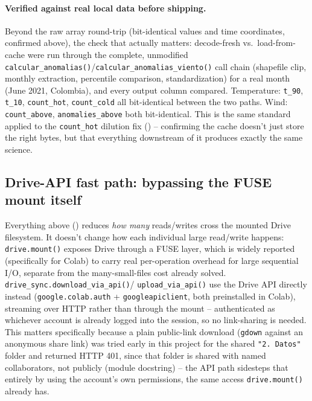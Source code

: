 \documentclass[11pt]{article}
\begin{document}
\paragraph{Verified against real local data before shipping.} Beyond the
raw array round-trip (bit-identical values and time coordinates,
confirmed above), the check that actually matters: decode-fresh vs.\
load-from-cache were run through the complete, unmodified
\texttt{calcular\_anomalias()}/\texttt{calcular\_anomalias\_viento()}
call chain (shapefile clip, monthly extraction, percentile comparison,
standardization) for a real month (June 2021, Colombia), and every
output column compared. Temperature: \texttt{t\_90}, \texttt{t\_10},
\texttt{count\_hot}, \texttt{count\_cold} all bit-identical between the
two paths. Wind: \texttt{count\_above}, \texttt{anomalies\_above} both
bit-identical. This is the same standard applied to the
\texttt{count\_hot} dilution fix () --
confirming the cache doesn't just store the right bytes, but that
everything downstream of it produces exactly the same science.

\subsection{Drive-API fast path: bypassing the FUSE mount itself}
\label{sec:drive-api-fast-path}

Everything above ()
reduces \emph{how many} reads/writes cross the mounted Drive filesystem.
It doesn't change how each individual large read/write happens:
\texttt{drive.mount()} exposes Drive through a FUSE layer, which is
widely reported (specifically for Colab) to carry real per-operation
overhead for large sequential I/O, separate from the many-small-files
cost already solved. \texttt{drive\_sync.download\_via\_api()}/
\texttt{upload\_via\_api()} use the Drive API directly instead
(\texttt{google.colab.auth} + \texttt{googleapiclient}, both preinstalled
in Colab), streaming over HTTP rather than through the mount --
authenticated as whichever account is already logged into the session,
so no link-sharing is needed. This matters specifically because a plain
public-link download (\texttt{gdown} against an anonymous share link)
was tried early in this project for the shared \texttt{"2. Datos"}
folder and returned HTTP 401, since that folder is shared with named
collaborators, not publicly (module docstring) -- the API path sidesteps
that entirely by using the account's own permissions, the same access
\texttt{drive.mount()} already has.
\end{document}
